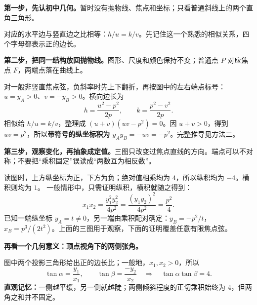 \clearpage
\begin{explanationbox}
\textbf{第一步，先认初中几何。}暂时没有抛物线、焦点和坐标；只看普通斜线上的两个直角三角形。
\begin{center}\end{center}
对应的水平边与竖直边之比相等：$h/u=k/v$。先记住这一个熟悉的相似关系，四个字母都表示正的边长。
\end{explanationbox}
\clearpage
\begin{explanationbox}
\textbf{第二步，把同一结构放回抛物线。}图形、尺度和颜色保持不变；普通点 $P$ 对应焦点 $F$，两端点落在曲线上。
\begin{center}\end{center}
对一般非竖直焦点弦，负斜率时先上下翻折，再按图中的左右端点标号：$u=y_A>0$、$v=-y_B>0$。横向边长为
\[
 h=\frac{u^2-p^2}{2p},\qquad k=\frac{p^2-v^2}{2p}.
\]
相似给 $h/u=k/v$，整理成 $(u+v)(uv-p^2)=0$。因 $u+v>0$，得到 $uv=p^2$，所以\textbf{带符号的纵坐标积为 $y_Ay_B=-uv=-p^2$}。完整推导见方法二。
\end{explanationbox}
\clearpage
\begin{explanationbox}
\textbf{第三步，观察变化，再抽象成定值。}三图只改变过焦点直线的方向。端点可以不对称；不要把“乘积固定”误读成“两数互为相反数”。
\begin{center}\end{center}
读图时，上方纵坐标为正，下方为负；绝对值相乘均为 $4$，所以纵积均为 $-4$。横积则均为 $1$。
一般情形中，只需证明纵积，横积就随之得到：
\[
 x_1x_2=\frac{y_1^2y_2^2}{4p^2}=\frac{(y_1y_2)^2}{4p^2}=\frac{p^2}{4}.
\]
已知一端纵坐标 $y_A=t\ne0$，另一端由乘积配对确定：$y_B=-p^2/t$，$x_B=p^3/(2t^2)$。上面的三图用于观察，下面的证明覆盖任意有限焦点弦。

\end{explanationbox}
\clearpage
\begin{explanationbox}
\textbf{再看一个几何意义：顶点视角下的两侧张角。}
\begin{center}\end{center}
图中两个投影三角形给出正的边长比；一般地，$x_1,x_2>0$，所以
\[
 \tan\alpha=\frac{y_1}{x_1},\qquad
 \tan\beta=\frac{-y_2}{x_2}
 \quad\Longrightarrow\quad
 \boxed{\tan\alpha\tan\beta=4}.
\]
\textbf{直观记忆：}一侧越平缓，另一侧就越陡；两侧倾斜程度的正切乘积始终为 $4$，但两角之和并不固定。
\end{explanationbox}

